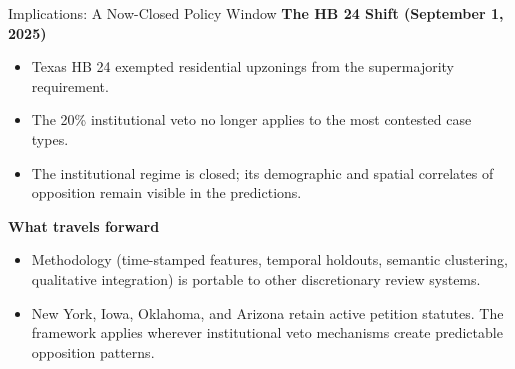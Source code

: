 \documentclass[10pt, aspectratio=169]{beamer}
\begin{document}
\begin{frame}{Implications: A Now-Closed Policy Window}
    \textbf{The HB 24 Shift (September 1, 2025)}
    \begin{itemize}
        \item Texas HB 24 exempted residential upzonings from the supermajority requirement.
        \item The 20\% institutional veto no longer applies to the most contested case types.
        \item The institutional regime is closed; its demographic and spatial correlates of opposition remain visible in the predictions.
    \end{itemize}

    \vspace{1.2em}
    \textbf{What travels forward}
    \begin{itemize}
        \item Methodology (time-stamped features, temporal holdouts, semantic clustering, qualitative integration) is portable to other discretionary review systems.
        \item New York, Iowa, Oklahoma, and Arizona retain active petition statutes. The framework applies wherever institutional veto mechanisms create predictable opposition patterns.
    \end{itemize}
\end{frame}
\end{document}
